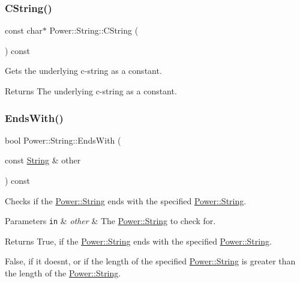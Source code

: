 \subsubsection{\texorpdfstring{C\+String()}{CString()}}
{\footnotesize\ttfamily const char$\ast$ Power\+::\+String\+::\+C\+String (\begin{DoxyParamCaption}{ }\end{DoxyParamCaption}) const\hspace{0.3cm}{\ttfamily [inline]}}



Gets the underlying c-\/string as a constant. 

\begin{DoxyReturn}{Returns}
The underlying c-\/string as a constant. 
\end{DoxyReturn}
\mbox{\label{class_power_1_1_string_ae936d98f4be00ce5b901a561cac63ab0}} 
\subsubsection{\texorpdfstring{Ends\+With()}{EndsWith()}\hspace{0.1cm}{\footnotesize\ttfamily [1/4]}}
{\footnotesize\ttfamily bool Power\+::\+String\+::\+Ends\+With (\begin{DoxyParamCaption}\item[{const \hyperlink{class_power_1_1_string}{String} \&}]{other }\end{DoxyParamCaption}) const\hspace{0.3cm}{\ttfamily [inline]}}



Checks if the \hyperlink{class_power_1_1_string}{Power\+::\+String} ends with the specified \hyperlink{class_power_1_1_string}{Power\+::\+String}. 


\begin{DoxyParams}[1]{Parameters}
\mbox{\tt in}  & {\em other} & The \hyperlink{class_power_1_1_string}{Power\+::\+String} to check for. \\
\hline
\end{DoxyParams}
\begin{DoxyReturn}{Returns}
True, if the \hyperlink{class_power_1_1_string}{Power\+::\+String} ends with the specified \hyperlink{class_power_1_1_string}{Power\+::\+String}. 

False, if it doesn\textquotesingle{}t, or if the length of the specified \hyperlink{class_power_1_1_string}{Power\+::\+String} is greater than the length of the \hyperlink{class_power_1_1_string}{Power\+::\+String}. 
\end{DoxyReturn}
\mbox{\label{class_power_1_1_string_a007514d96b8e99416e0c10f6b72675c5}} 
